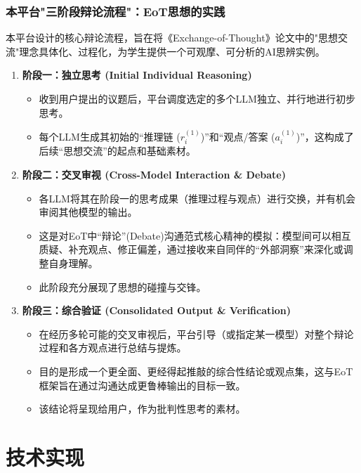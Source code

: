 \documentclass[aspectratio=169]{beamer} %
\begin{document}
\begin{frame}[allowframebreaks]
\frametitle{本平台"三阶段辩论流程"：EoT思想的实践}
本平台设计的核心辩论流程，旨在将《Exchange-of-Thought》论文中的"思想交流"理念具体化、过程化，为学生提供一个可观摩、可分析的AI思辨实例。
\begin{enumerate}
    \item \textbf{阶段一：独立思考 (Initial Individual Reasoning)}
    \begin{itemize}
        \item 收到用户提出的议题后，平台调度选定的多个LLM独立、并行地进行初步思考。
        \item 每个LLM生成其初始的“推理链 ($r_i^{(1)}$)”和“观点/答案 ($a_i^{(1)}$)”，这构成了后续“思想交流”的起点和基础素材。
    \end{itemize}

    \item \textbf{阶段二：交叉审视 (Cross-Model Interaction \& Debate)}
    \begin{itemize}
        \item 各LLM将其在阶段一的思考成果（推理过程与观点）进行交换，并有机会审阅其他模型的输出。
        \item 这是对EoT中“辩论”(Debate)沟通范式核心精神的模拟：模型间可以相互质疑、补充观点、修正偏差，通过接收来自同伴的“外部洞察”来深化或调整自身理解。
        \item 此阶段充分展现了思想的碰撞与交锋。
    \end{itemize}

    \item \textbf{阶段三：综合验证 (Consolidated Output & Verification)}
    \begin{itemize}
        \item 在经历多轮可能的交叉审视后，平台引导（或指定某一模型）对整个辩论过程和各方观点进行总结与提炼。
        \item 目的是形成一个更全面、更经得起推敲的综合性结论或观点集，这与EoT框架旨在通过沟通达成更鲁棒输出的目标一致。
        \item 该结论将呈现给用户，作为批判性思考的素材。
    \end{itemize}
\end{enumerate}
\end{frame}


\section{技术实现}
\end{document}
